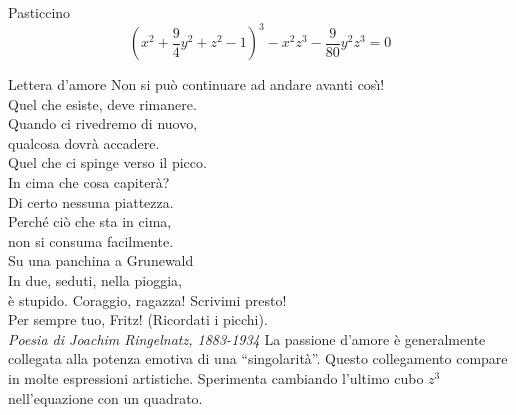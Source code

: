 \begin{surferPage}{Pasticcino}
\[(x^2+ \frac94y^2	+ z^2- 1)^3- x^2z^3	- \frac9{80}y^2z^3	= 0\]

\singlespacing
Lettera d'amore
\singlespacing
Non si pu\`o continuare ad andare avanti cos\`{\i}!\\
Quel che esiste, deve rimanere.\\
Quando ci rivedremo di nuovo,\\
qualcosa dovr\`a accadere.\\
Quel che ci spinge verso il picco.\\
In cima che cosa capiter\`a?\\
Di certo nessuna piattezza.\\
Perch\'e ci\`o che sta in cima,\\
non si consuma facilmente.\\
Su una panchina a Grunewald\\
In due, seduti, nella pioggia,\\
\`e stupido. Coraggio, ragazza! Scrivimi presto!\\
Per sempre tuo, Fritz! (Ricordati i picchi).\\
{\it Poesia di Joachim Ringelnatz, 1883-1934}
\singlespacing
La passione d'amore \`e generalmente collegata alla potenza emotiva di una ``singolarit\`a''. Questo collegamento compare in molte espressioni artistiche.
\singlespacing
Sperimenta cambiando l'ultimo cubo $z^3$ nell'equazione con un quadrato.
\end{surferPage}
